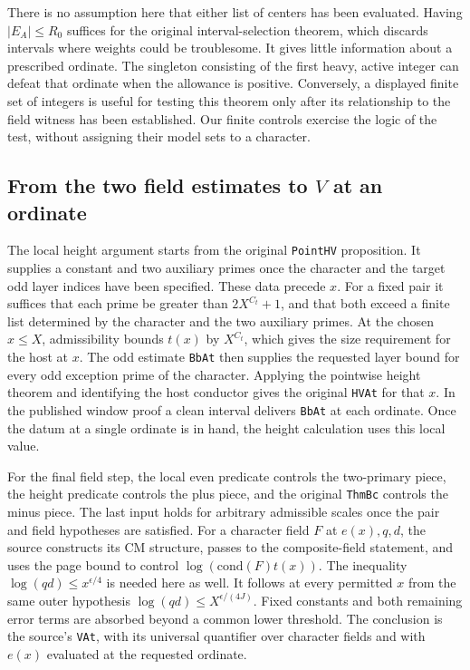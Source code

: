 \documentclass[12pt,letterpaper]{article}
\begin{document}
There is no assumption here that either list of centers has been evaluated. Having $|E_A|\leq R_0$ suffices for the original interval-selection theorem, which discards intervals where weights could be troublesome. It gives little information about a prescribed ordinate. The singleton consisting of the first heavy, active integer can defeat that ordinate when the allowance is positive. Conversely, a displayed finite set of integers is useful for testing this theorem only after its relationship to the field witness has been established. Our finite controls exercise the logic of the test, without assigning their model sets to a character.

\subsection{From the two field estimates to \texorpdfstring{$V$}{V} at an ordinate}

The local height argument starts from the original \texttt{PointHV} proposition. It supplies a constant and two auxiliary primes once the character and the target odd layer indices have been specified. These data precede $x$. For a fixed pair it suffices that each prime be greater than $2X^{C_t}+1$, and that both exceed a finite list determined by the character and the two auxiliary primes. At the chosen $x\leq X$, admissibility bounds $t(x)$ by $X^{C_t}$, which gives the size requirement for the host at $x$. The odd estimate \texttt{BbAt} then supplies the requested layer bound for every odd exception prime of the character. Applying the pointwise height theorem and identifying the host conductor gives the original \texttt{HVAt} for that $x$. In the published window proof a clean interval delivers \texttt{BbAt} at each ordinate. Once the datum at a single ordinate is in hand, the height calculation uses this local value.

For the final field step, the local even predicate controls the two-primary piece, the height predicate controls the plus piece, and the original \texttt{ThmBc} controls the minus piece. The last input holds for arbitrary admissible scales once the pair and field hypotheses are satisfied. For a character field $F$ at $e(x),q,d$, the source constructs its CM structure, passes to the composite-field statement, and uses the page bound to control $\log(\mathrm{cond}(F)t(x))$. The inequality $\log(qd)\leq x^{\epsilon/4}$ is needed here as well. It follows at every permitted $x$ from the same outer hypothesis $\log(qd)\leq X^{\epsilon/(4J)}$. Fixed constants and both remaining error terms are absorbed beyond a common lower threshold. The conclusion is the source's \texttt{VAt}, with its universal quantifier over character fields and with $e(x)$ evaluated at the requested ordinate.
\end{document}
